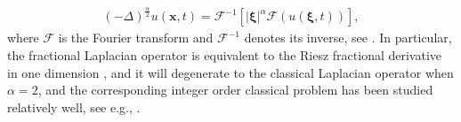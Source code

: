 \documentclass[preprint,compress,3p,10pt,fleqn]{elsarticle}
\numberwithin{equation}{section}
\begin{document}
\begin{align}\label{eq_4}
	(-\Delta)^{\frac{\alpha}{2}} u(\boldsymbol{x},t)=\mathcal{F}^{-1}\left[|\boldsymbol{\xi}|^{\alpha} \mathcal{F}(u(\boldsymbol{\xi},t))\right],
	\end{align}
where $\mathcal{F}$ is the Fourier transform and $\mathcal{F}^{-1}$ denotes its inverse, see  \cite{caffarelliExtensionProblemRelated2007}.
In particular, the fractional Laplacian operator is equivalent to the Riesz fractional derivative in one dimension \cite{yangNumericalMethodsFractional2010,demengelFunctionalSpacesTheory2012}, and it will degenerate to the classical Laplacian operator when $\alpha=2$, and the corresponding integer order classical problem has been studied relatively well, see e.g., \cite{zhangConservativeNumericalScheme2003,baoUniformErrorEstimates2012,chengSeveralConservativeCompact2018,brugnanoClassEnergyconservingHamiltonian2018}.

%
\end{document}
